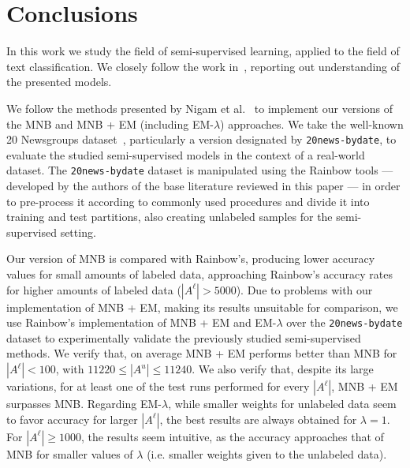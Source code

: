 \section{Conclusions}
\label{sec:conclusions}

In this work we study the field of semi-supervised learning, applied to the 
field of text classification. We closely follow the work in~\cite{McCallum98acomparison,Nigam2000}, reporting out 
understanding of the presented models.\vertbreak

We follow the methods presented by Nigam et al.~\cite{Nigam2000} to implement our 
versions of the MNB and MNB + EM (including EM-$\lambda$) approaches. We 
take the well-known 20 Newsgroups dataset~\cite{Lang95}, particularly 
a version designated by \verb+20news-bydate+, to evaluate the studied 
semi-supervised models in the context of a real-world dataset. The 
\verb+20news-bydate+ dataset is manipulated using the Rainbow tools --- developed 
by the authors of the base literature reviewed in this paper --- in order to 
pre-process it according to commonly used procedures and divide it 
into training and test partitions, also creating unlabeled samples for the 
semi-supervised setting.\vertbreak

Our version of MNB is compared with Rainbow's, producing lower accuracy values 
for small amounts of labeled data, approaching Rainbow's accuracy rates for 
higher amounts of labeled data ($|A^\ell| > 5000$). Due to problems with our 
implementation of MNB + EM, making its results unsuitable for comparison, we 
use Rainbow's implementation of MNB + EM and EM-$\lambda$ over the 
\verb+20news-bydate+ dataset to experimentally validate the previously studied 
semi-supervised methods. We verify that, on average MNB + EM performs better 
than MNB for $|A^\ell| < 100$, with $11220 \le |A^u| \le 11240$. We also verify that, 
despite its large variations, for at least one of the test runs performed 
for every $|A^\ell|$, MNB + EM surpasses MNB. Regarding EM-$\lambda$, while 
smaller weights for unlabeled data seem to favor accuracy for larger 
$|A^\ell|$, the best results are always obtained for $\lambda = 1$. For 
$|A^\ell| \ge 1000$, the results seem intuitive, as the accuracy approaches 
that of MNB for smaller values of $\lambda$ (i.e. smaller weights given to 
the unlabeled data).
